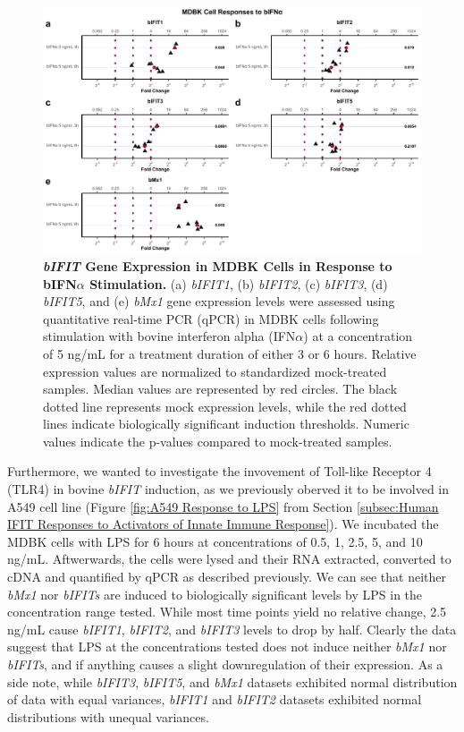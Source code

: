 \begin{figure}
    \centering
    \includegraphics[width=1\linewidth]{07. Chapter 2/Figs/02. Induction/01. mdbk_treat_bifna.pdf}
    \caption[\textit{bIFIT} Gene Expression in MDBK Cells in Response to bIFN\(\alpha\) Stimulation.]{\textbf{\textit{bIFIT} Gene Expression in MDBK Cells in Response to bIFN\(\alpha\) Stimulation.} (a) \textit{bIFIT1}, (b) \textit{bIFIT2}, (c) \textit{bIFIT3}, (d) \textit{bIFIT5}, and (e) \textit{bMx1} gene expression levels were assessed using quantitative real-time PCR (qPCR) in MDBK cells following stimulation with bovine interferon alpha (IFN\(\alpha\)) at a concentration of 5 ng/mL for a treatment duration of either 3 or 6 hours. Relative expression values are normalized to standardized mock-treated samples. Median values are represented by red circles. The black dotted line represents mock expression levels, while the red dotted lines indicate biologically significant induction thresholds. Numeric values indicate the p-values compared to mock-treated samples.}
    \label{fig:MDBK responses to bIFNa}
\end{figure}

Furthermore, we wanted to investigate the invovement of Toll-like Receptor 4 (TLR4) in bovine \textit{bIFIT} induction, as we previously oberved it to be involved in A549 cell line (Figure \ref{fig:A549 Response to LPS} from Section \ref{subsec:Human IFIT Responses to Activators of Innate Immune Response}). We incubated the MDBK cells with LPS for 6 hours at concentrations of 0.5, 1, 2.5, 5, and 10 ng/mL. Aftwerwards, the cells were lysed and their RNA extracted, converted to cDNA and quantified by qPCR as described previously. We can see that neither \textit{bMx1} nor \textit{bIFITs} are induced to biologically significant levels by LPS in the concentration range tested. While most time points yield no relative change, 2.5 ng/mL cause \textit{bIFIT1}, \textit{bIFIT2}, and \textit{bIFIT3} levels to drop by half. Clearly the data suggest that LPS at the concentrations tested does not induce neither \textit{bMx1} nor \textit{bIFITs}, and if anything causes a slight downregulation of their expression. As a side note, while \textit{bIFIT3}, \textit{bIFIT5}, and \textit{bMx1} datasets exhibited normal distribution of data with equal variances, \textit{bIFIT1} and \textit{bIFIT2} datasets exhibited normal distributions with unequal variances.


